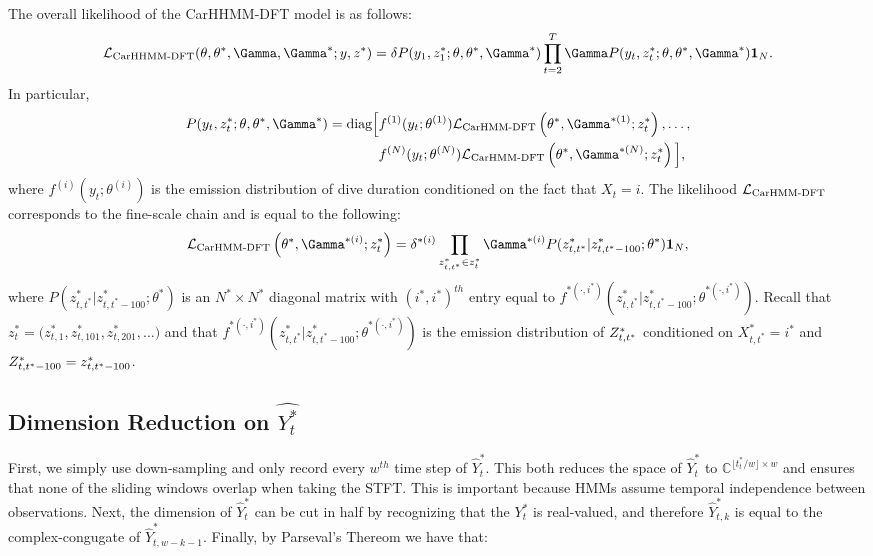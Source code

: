 The overall likelihood of the CarHHMM-DFT model is as follows:
%
$$\calL_{\text{CarHHMM-DFT}}(\theta,\theta^*,\Gamma,\Gamma^*;y,z^*) = \delta P(y_1,z_1^*;\theta,\theta^*,\Gamma^*) \prod_{t=2}^T \Gamma P(y_t,z_t^*;\theta,\theta^*,\Gamma^*) \mathbf{1}_N.$$
%
In particular,
%
\begin{align*}
P(y_t,z_t^*;\theta,\theta^*,\Gamma^*)  = \text{diag}\Big[&f^{(1)}(y_t;\theta^{(1)})\calL_{\text{CarHMM-DFT}}\left(\theta^*,\Gamma^{*(1)};z_t^*\right), \ldots , \\
&f^{(N)}(y_t;\theta^{(N)})\calL_{\text{CarHMM-DFT}}\left(\theta^*,\Gamma^{*(N)};z_t^*\right) \Big],
\end{align*}
%
where $f^{(i)}(y_t;\theta^{(i)})$ is the emission distribution of dive duration conditioned on the fact that $X_t = i$. The likelihood $\mathcal{L}_{\text{CarHMM-DFT}}$ corresponds to the fine-scale chain and is equal to the following:
%
$$\calL_{\text{CarHMM-DFT}}\left(\theta^{*},\Gamma^{*(i)};z_t^*\right) = \delta^{*(i)} \prod_{z^*_{t,t^*} \in z^*_t} \Gamma^{*(i)} P(z^*_{t,t^*}|z^*_{t,t^*-100};\theta^*) \mathbf{1}_N,$$
%
where $P(z^*_{t,t^*}|z^*_{t,t^*-100};\theta^*)$ is an $N^* \times N^*$ diagonal matrix with $(i^*,i^*)^{th}$ entry equal to $f^{*(\cdot,i^*)}(z^*_{t,t^*}|z^*_{t,t^*-100}; \theta^{*(\cdot,i^*)})$.
%
Recall that $z^*_t = \Big(z^*_{t,1},z^*_{t,101},z^*_{t,201},\ldots\Big)$ and that $f^{*(\cdot,i^*)}(z^*_{t,t^*}|z^*_{t,t^*-100}; \theta^{*(\cdot,i^*)})$ is the emission distribution of $Z^*_{t,t^*}$ conditioned on $X^*_{t,t^*} = i^*$ and $Z^*_{t,t^*-100} = z^*_{t,t^*-100}$.


\iffalse


\subsection{Dimension Reduction on $\hat{Y_t^*}$}

First, we simply use down-sampling and only record every $w^{th}$ time step of $\hat{Y}_t^*$. This both reduces the space of $\hat{Y}_t^*$ to $\mathbb{C}^{\lfloor t^*_t / w \rfloor \times w}$ and ensures that none of the sliding windows overlap when taking the STFT. This is important because HMMs assume temporal independence between observations. Next, the dimension of $\hat{Y}_t^*$ can be cut in half by recognizing that the $Y_t^*$ is real-valued, and therefore $\hat{Y}_{t,k}^*$ is equal to the complex-congugate of $\hat{Y}_{t,w-k-1}^*$. Finally, by Parseval's Thereom we have that:

